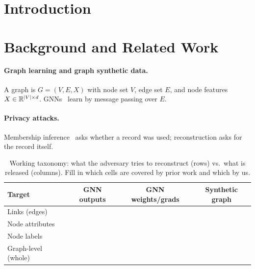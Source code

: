 \section{Introduction}
\label{sec:intro}

\section{Background and Related Work}
\label{sec:related}
\paragraph{Graph learning and graph synthetic data.}
A graph is $G=(V,E,X)$ with node set $V$, edge set $E$, and node features $X\in\mathbb{R}^{|V|\times d}$. GNNs~\citep{kipf2017semi} learn by message passing over $E$. 

\paragraph{Privacy attacks.}
Membership inference~\citep{shokri2017membership} asks whether a record was used; reconstruction asks for the record itself. 

\begin{table}[t]
  \centering
  \caption{Working taxonomy: what the adversary tries to reconstruct (rows) vs.\ what is released (columns). Fill in which cells are covered by prior work and which by us.}
  \label{tab:taxonomy}
  \small
  \begin{tabular}{@{}lccc@{}}
    \toprule
    Target & GNN outputs & GNN weights/grads & Synthetic graph \\
    \midrule
    Links (edges)        & \todo{} & \todo{} & \todo{} \\
    Node attributes      & \todo{} & \todo{} & \todo{} \\
    Node labels          & \todo{} & \todo{} & \todo{} \\
    Graph-level (whole)  & \todo{} & \todo{} & \todo{} \\
    \bottomrule
  \end{tabular}
\end{table}

